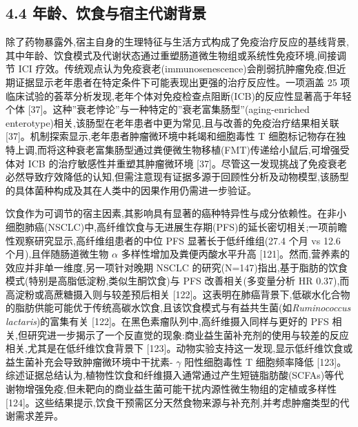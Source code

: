 \subsection{4.4 年龄、饮食与宿主代谢背景}\label{ux5e74ux9f84ux996eux98dfux4e0eux5bbfux4e3bux4ee3ux8c22ux80ccux666f}

除了药物暴露外,宿主自身的生理特征与生活方式构成了免疫治疗反应的基线背景,其中年龄、饮食模式及代谢状态通过重塑肠道微生物组或系统性免疫环境,间接调节 ICI 疗效。传统观点认为免疫衰老(immunosenescence)会削弱抗肿瘤免疫,但近期证据显示老年患者在特定条件下可能表现出更强的治疗反应性。一项涵盖 25 项临床试验的荟萃分析发现,老年个体对免疫检查点阻断(ICB)的反应性显著高于年轻个体 {[}37{]}。这种''衰老悖论''与一种特定的''衰老富集肠型''(aging-enriched enterotype)相关,该肠型在老年患者中更为常见,且与改善的免疫治疗结果相关联 {[}37{]}。机制探索显示,老年患者肿瘤微环境中耗竭和细胞毒性 T 细胞标记物存在独特上调,而将这种衰老富集肠型通过粪便微生物移植(FMT)传递给小鼠后,可增强受体对 ICB 的治疗敏感性并重塑其肿瘤微环境 {[}37{]}。尽管这一发现挑战了免疫衰老必然导致疗效降低的认知,但需注意现有证据多源于回顾性分析及动物模型,该肠型的具体菌种构成及其在人类中的因果作用仍需进一步验证。

饮食作为可调节的宿主因素,其影响具有显著的癌种特异性与成分依赖性。在非小细胞肺癌(NSCLC)中,高纤维饮食与无进展生存期(PFS)的延长密切相关;一项前瞻性观察研究显示,高纤维组患者的中位 PFS 显著长于低纤维组(27.4 个月 vs 12.6 个月),且伴随肠道微生物 \(\alpha\) 多样性增加及粪便丙酸水平升高 {[}121{]}。然而,营养素的效应并非单一维度,另一项针对晚期 NSCLC 的研究(N=147)指出,基于脂肪的饮食模式(特别是高脂低淀粉,类似生酮饮食)与 PFS 改善相关(多变量分析 HR 0.37),而高淀粉或高蔗糖摄入则与较差预后相关 {[}122{]}。这表明在肺癌背景下,低碳水化合物的脂肪供能可能优于传统高碳水饮食,且该饮食模式与有益共生菌(如\emph{Ruminococcus lactaris})的富集有关 {[}122{]}。在黑色素瘤队列中,高纤维摄入同样与更好的 PFS 相关,但研究进一步揭示了一个反直觉的现象:商业益生菌补充剂的使用与较差的反应相关,尤其是在低纤维饮食背景下 {[}123{]}。动物实验支持这一发现,显示低纤维饮食或益生菌补充会导致肿瘤微环境中干扰素- \(\gamma\) 阳性细胞毒性 T 细胞频率降低 {[}123{]}。综述证据总结认为,植物性饮食和纤维摄入通常通过产生短链脂肪酸(SCFAs)等代谢物增强免疫,但未靶向的商业益生菌可能干扰内源性微生物组的定植或多样性 {[}124{]}。这些结果提示,饮食干预需区分天然食物来源与补充剂,并考虑肿瘤类型的代谢需求差异。

